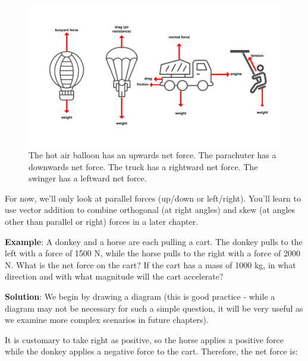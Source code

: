 \begin{figure}
\includegraphics[width=6in]{net_forces.png}
\caption{The hot air balloon has an upwards net force. The parachuter has a downwards net force. The truck has a rightward net force. The swinger has a leftward net force.}
\label{fig:net_forces}
\end{figure}

For now, we'll only look at parallel forces (up/down or left/right). You'll learn 
to use vector addition to combine orthogonal (at right angles) and skew (at angles
other than parallel or right) forces in a later chapter. 

\textbf{Example}: A donkey and a horse are each pulling a cart. The donkey pulls 
to the left with a force of 1500 N, while the horse pulls to the right with a 
force of 2000 N. What is the net force on the cart? If the cart has a mass of 
1000 kg, in what direction and with what magnitude will the cart accelerate?

\textbf{Solution}: We begin by drawing a diagram (this is good practice - while 
a diagram may not be necessary for such a simple question, it will be very useful 
as we examine more complex scenarios in future chapters). 

\begin{center}
\end{center}

It is customary to take right as positive, so the horse applies a positive force 
while the donkey applies a negative force to the cart. Therefore, the net force 
is:

